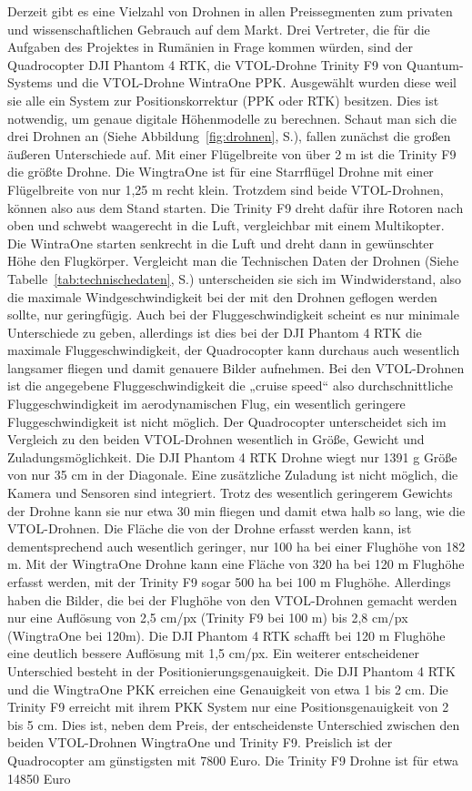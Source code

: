 Derzeit gibt es eine Vielzahl von Drohnen in allen Preissegmenten zum privaten und wissenschaftlichen Gebrauch auf dem Markt. Drei Vertreter, die für die Aufgaben des Projektes in Rumänien in Frage kommen würden, sind der Quadrocopter DJI Phantom 4 RTK, die VTOL-Drohne Trinity F9 von Quantum-Systems und die VTOL-Drohne WintraOne PPK. Ausgewählt wurden diese weil sie alle ein System zur Positionskorrektur (PPK oder RTK) besitzen. Dies ist notwendig, um genaue digitale Höhenmodelle zu berechnen. Schaut man sich die drei Drohnen an (Siehe Abbildung~\ref{fig:drohnen}, S.\pageref{fig:drohnen}), fallen zunächst die großen äußeren Unterschiede auf. Mit einer Flügelbreite von über 2 m ist die Trinity F9 die größte Drohne. Die WingtraOne ist für eine Starrflügel Drohne mit einer Flügelbreite von nur 1,25 m recht klein. Trotzdem sind beide VTOL-Drohnen, können also aus dem Stand starten. Die Trinity F9 dreht dafür ihre Rotoren nach oben und schwebt waagerecht in die Luft, vergleichbar mit einem Multikopter. Die WintraOne starten senkrecht in die Luft und dreht dann in gewünschter Höhe den Flugkörper. Vergleicht man die Technischen Daten der Drohnen (Siehe Tabelle~\ref{tab:technischedaten}, S.\pageref{tab:technischedaten}) unterscheiden sie sich im Windwiderstand, also die maximale Windgeschwindigkeit bei der mit den Drohnen geflogen werden sollte, nur geringfügig. Auch bei der Fluggeschwindigkeit scheint es nur minimale Unterschiede zu geben, allerdings ist dies bei der DJI Phantom 4 RTK die maximale Fluggeschwindigkeit, der Quadrocopter kann durchaus auch wesentlich langsamer fliegen und damit genauere Bilder aufnehmen. Bei den VTOL-Drohnen ist die angegebene Fluggeschwindigkeit die „cruise speed“ also durchschnittliche Fluggeschwindigkeit im aerodynamischen Flug, ein wesentlich geringere Fluggeschwindigkeit ist nicht möglich. Der Quadrocopter unterscheidet sich im Vergleich zu den beiden VTOL-Drohnen wesentlich in Größe, Gewicht und Zuladungsmöglichkeit. Die DJI Phantom 4 RTK Drohne wiegt nur 1391 g Größe von nur 35 cm in der Diagonale. Eine zusätzliche Zuladung ist nicht möglich, die Kamera und Sensoren sind integriert. Trotz des wesentlich geringerem Gewichts der Drohne kann sie nur etwa 30 min fliegen und damit etwa halb so lang, wie die VTOL-Drohnen. Die Fläche die von der Drohne erfasst werden kann, ist dementsprechend auch wesentlich geringer, nur 100 ha bei einer Flughöhe von 182 m. Mit der WingtraOne Drohne kann eine Fläche von 320 ha bei 120 m Flughöhe erfasst werden, mit der Trinity F9 sogar 500 ha bei 100 m Flughöhe. Allerdings haben die Bilder, die bei der Flughöhe von den VTOL-Drohnen gemacht werden nur eine Auflösung von 2,5 cm/px (Trinity F9 bei 100 m) bis 2,8 cm/px (WingtraOne bei 120m). Die DJI Phantom 4 RTK schafft bei 120 m Flughöhe eine deutlich bessere Auflösung mit 1,5 cm/px. Ein weiterer entscheidener Unterschied besteht in der Positionierungsgenauigkeit. Die DJI Phantom 4 RTK und die WingtraOne PKK erreichen eine Genauigkeit von etwa 1 bis 2 cm. Die Trinity F9 erreicht mit ihrem PKK System nur eine Positionsgenauigkeit von 2 bis 5 cm. Dies ist, neben dem Preis, der entscheidenste Unterschied zwischen den beiden VTOL-Drohnen WingtraOne und Trinity F9. Preislich ist der Quadrocopter am günstigsten mit 7800 Euro. Die Trinity F9 Drohne ist für etwa 14850 Euro 